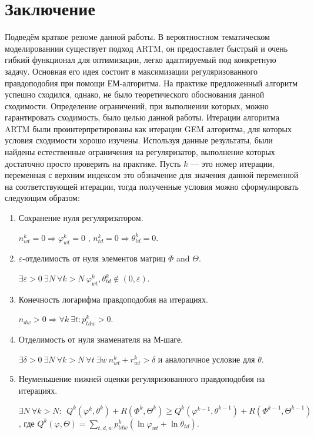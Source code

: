 \documentclass[12pt]{article}
\renewcommand{\geq}{\geqslant}
\renewcommand{\phi}{\varphi}
\begin{document}
\section{Заключение}
	Подведём краткое резюме данной работы. В вероятностном тематическом моделированиии существует подход ARTM, он предоставлет быстрый и очень гибкий функционал для оптимизации, легко адаптируемый под конкретную задачу. Основная его идея состоит в максимизации регуляризованного правдоподобия при помощи ЕМ-алгоритма. На практике предложенный алгоритм успешно сходился, однако, не было теоретического обоснования данной сходимости. Определение ограничений, при выполнении которых, можно гарантировать сходимость, было целью данной работы. Итерации алгоритма ARTM были проинтерпретированы как итерации GEM алгоритма, для которых условия сходимости хорошо изучены. Используя данные результаты, были найдены естественные ограничения на регуляризатор, выполнение которых достаточно просто проверить на практике. Пусть $k$ --- это номер итерации, переменная с  верхним индексом это обзначение для значения данной переменной на соответствующей итерации, тогда полученные условия можно сформулировать следующим образом:
\begin{enumerate}
\item Сохранение нуля регуляризатором.
\smallskip

$ n^k_{wt} = 0 \Rightarrow \phi^k_{wt} = 0$ , $n^k_{td} = 0 \Rightarrow \theta^k_{td} = 0$.
\item $\varepsilon$-отделимость от нуля элементов матриц $\Phi$ and $\Theta$.
\smallskip

$\exists \varepsilon>0\ \exists N\ \forall k > N\ \phi^k_{wt}, \theta^k_{td} \notin (0, \varepsilon)$. 
\item  Конечность логарифма правдоподобия на итерациях.
\smallskip

$ n_{dw}>0 \Rightarrow \forall k\ \exists t\colon p^k_{tdw} > 0$.
\item Отделимость от нуля знаменателя на М-шаге.
\smallskip

$\exists \delta >0\ \exists N\ \forall k > N \ \forall t\ \exists w\  n^k_{wt} + r^k_{wt} > \delta$ и аналогичное условие для $\theta$. 
\item Неуменьшение нижней оценки регуляризованного правдоподобия на итерациях.
\smallskip

$\exists N\ \forall k > N\colon\ \ Q^k (\phi^k, \theta^k)+ R(\Phi^k, \Theta^k) \geq Q^k(\phi^{k-1}, \theta^{k-1}) + R(\Phi^{k-1}, \Theta^{k-1})$, где $Q^k(\phi, \Theta) = \sum\limits_{t,d,w} p^k_{tdw} (\ln \phi_{wt} + \ln \theta_{td})$.
\end{enumerate}
\end{document}
